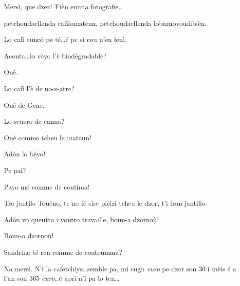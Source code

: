 \begin{drama}
\Saventaspeaks Mersì, que dzen! Fièn eunna fotografie\ldots



\Saventaspeaks{} petchoudacllenda cafìlomateun, petchoudacllenda lobarnovoudibièn.

\Baristaspeaks{} Lo cafì eunc\'o pe té\ldots é pe si cou n'en fenì.

\Richardspeaks Acouta\ldots lo vèyo l'è biodégradable?

\Baristaspeaks Ouè.

\Richardspeaks Lo cafì l'è de no-z-atre?

\Baristaspeaks Ouè de Gene.

\Richardspeaks Lo seucro de canna?

\Baristaspeaks Ouè comme tcheu le mateun!

\Richardspeaks Ad\'on lo bèyo!

\Baristaspeaks{} Pe paì?

\Tuenospeaks Payo mé comme de coutima!


\Gerominespeaks Tro jantilo Touéno, te no fé sise plèizì tcheu le dzor, t'i fran jantillo.

\Baristaspeaks Ad\'on vo queutto i voutro travaille, boun-a dzornoù!

\Tcheuttespeaks Boun-a dzornoù!


\Baristaspeaks{} Sandrino té ren comme de couteumma?

\Sandrinospeaks Na mersì. N’i la cafetchiye\ldots semble pa, mi eugn \textit{euro} pe dzor son 30 i mèis é a l’an son 365 \textit{euro}\ldots é aprì n'i pa lo ten\ldots






\end{drama}

